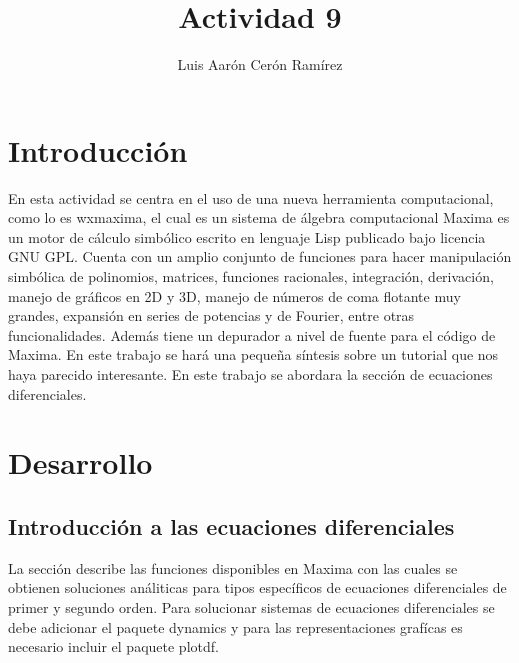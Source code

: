 \documentclass{article}
\title{Actividad 9}
\author{Luis Aarón Cerón Ramírez}
\begin{document}
\maketitle
\section{Introducción}
En esta actividad se centra en el uso de una nueva herramienta computacional, como lo es wxmaxima, el cual es un sistema de álgebra computacional Maxima es un motor de cálculo simbólico escrito en lenguaje Lisp publicado bajo licencia GNU GPL.
\newline
Cuenta con un amplio conjunto de funciones para hacer manipulación simbólica de polinomios, matrices, funciones racionales, integración, derivación, manejo de gráficos en 2D y 3D, manejo de números de coma flotante muy grandes, expansión en series de potencias y de Fourier, entre otras funcionalidades. Además tiene un depurador a nivel de fuente para el código de Maxima.
En este trabajo se hará una pequeña síntesis sobre un tutorial que nos haya parecido interesante. En este trabajo se abordara la sección de ecuaciones diferenciales.

\section{Desarrollo}
\subsection{Introducción a las ecuaciones diferenciales}
La sección describe las funciones disponibles en Maxima con las cuales se obtienen soluciones análiticas para tipos específicos de ecuaciones diferenciales de primer y segundo orden. Para solucionar sistemas de ecuaciones diferenciales se debe adicionar el paquete dynamics y para las representaciones grafícas es necesario incluir el paquete plotdf.
\end{document}
